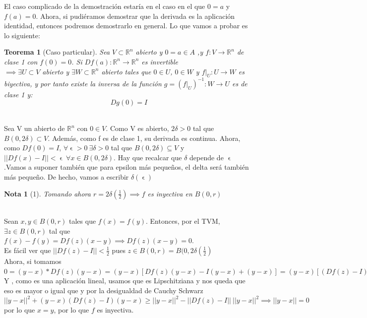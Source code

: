 \documentclass[11pt, a4paper, titlepage]{article}
\makeatletter
\let\epsilon\upvarepsilon
\renewenvironment{proof}[1][\proofname] {\vspace{-15pt}\par\pushQED{\qed}\normalfont\topsep6\p@\@plus6\p@\relax\trivlist\item[\hskip\labelsep\it#1\@addpunct{.}]\ignorespaces}{\popQED\endtrivlist\@endpefalse}
\newcommand{\R}{\mathbb{R}}
\theoremstyle{theorem-style}
\newtheorem*{nth}{Teorema}
\theoremstyle{definition-style}
\theoremstyle{remark-style}
\newtheorem*{nota}{Nota}
\theoremstyle{example-style}
\makeatother
\begin{document}
\begin{proof}
	El caso complicado de la demostración estaría en el caso en el que $0 = a$ y $f(a) = 0$. Ahora, si pudiéramos demostrar que la derivada es la aplicación identidad, entonces podremos demostrarlo en general. Lo que vamos  a probar es lo siguiente:
	
	\begin{nth}[Caso particular]
		Sea $V \subset \R^n$ abierto y $0=a\in A$ ,y $f:V \to \R^n$ de clase 1 con $f(0) = 0$. Si  
$Df(a): \R^n \to \R^n$ es invertible \\
$\implies \exists U\subset V$ abierto y $\exists W\subset\R^n$ abierto tales que $0\in U $, $0 \in W$ y $f|_U : U \to W$ es biyectiva, y por tanto existe la inversa de la función $g = (f|_U)^{-1}: W \to U$ es de clase 1 y:
	\[
	Dg(0) = I
	\]
\end{nth}
\begin{proof}[Demostración del caso particular del teorema]\hfill \\
Sea V un abierto de $\R^n$ con $0 \in V$. Como V es abierto, $2\delta > 0$ tal que $B(0,2\delta) \subset V$. Además, como f es de clase 1, su derivada es continua.
Ahora, como $Df(0)=I$, $\forall \epsilon > 0 \ \exists \delta > 0$ tal que $B(0,2\delta) \subseteq V$ y $||Df(x)-I|| < \epsilon \ \forall x \in B(0,2\delta)$. Hay que recalcar que $\delta$ depende de $\epsilon$.Vamos a suponer también que para epsilon más pequeños, el delta será también más pequeño. De hecho, vamos a escribir $\delta(\epsilon)$

\begin{nota}
	[1]
	Tomando ahora $r= 2\delta(\frac{1}{2}) \implies f$ es inyectiva en $B(0,r)$
\end{nota}
\begin{proof}[Demostración de la afirmación 1]\hfill \\
Sean $x,y \in B(0,r)$ tales que $f(x) = f(y)$. Entonces, por el TVM, $\exists z \in B(0,r)$ tal que $f(x)-f(y) = Df(z)(x-y) \implies Df(z)(x-y) = 0$.\\
Es fácil ver que $||Df(z) -I || < \frac{1}{2}$ pues $z \in B(0,r) = B(0,2\delta(\frac{1}{2})$\\
	Ahora, si tomamos\\
	$ 0=(y-x)*Df(z)(y-x) = (y-x)[Df(z)(y-x) -I(y-x) +(y-x)] = (y-x)[(Df(z)-I)(y-x) +(y-x)] = ||y-x||^2 +(y-x)(Df(z)-I)(y-x)$\\ 
	Y , como es una aplicación lineal, usamos que es Lipschitziana y nos queda que eso es mayor o igual que
y por la desigualdad de Cauchy Schwarz\\
	$ ||y-x||^2 +(y-x)(Df(z)-I)(y-x) \geq || y-x||^2 - ||Df(z) -I|| \ || y-x||^2 \implies ||y-x|| = 0$ por lo que $x=y$, por lo que $f$ es inyectiva.



\end{proof}
\end{proof}
\end{proof}
\end{document}
